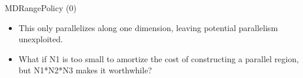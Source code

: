 \begin{frame}[fragile]{MDRangePolicy (0)}



  \vspace{-5pt}

  \begin{itemize}
    \item{\small{This only parallelizes along one dimension, leaving potential parallelism unexploited.}}
    \item{\small{What if N1 is too small to amortize the cost of constructing a parallel region, but N1*N2*N3 makes it worthwhile?}}
  \end{itemize}




\end{frame}



